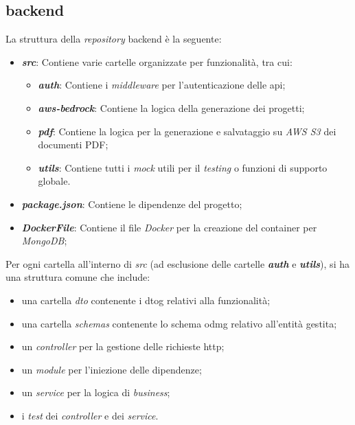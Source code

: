 \subsection{\gls{backend}}
\label{sez:backend}

La struttura della \textit{repository} \gls{backend} è la seguente:

\begin{itemize}
    \item \textbf{\textit{src}}: Contiene varie cartelle organizzate per funzionalità, tra cui:
    \begin{itemize}
        \item \textbf{\textit{auth}}: Contiene i \textit{middleware} per l'autenticazione delle \gls{api};
        \item \textbf{\textit{aws-bedrock}}: Contiene la logica della generazione dei progetti;
        \item \textbf{\textit{pdf}}: Contiene la logica per la generazione e salvataggio su \textit{AWS S3} dei documenti PDF;
        \item \textbf{\textit{utils}}: Contiene tutti i \textit{mock} utili per il \textit{testing} o funzioni di supporto globale.
    \end{itemize}
    \item \textbf{\textit{package.json}}: Contiene le dipendenze del progetto;
    \item \textbf{\textit{DockerFile}}: Contiene il file \textit{Docker} per la creazione del \gls{container} per \textit{MongoDB};
\end{itemize}

\noindent Per ogni cartella all'interno di \textit{src} (ad esclusione delle cartelle \textbf{\textit{auth}} e \textbf{\textit{utils}}), si ha una struttura comune che include:
\begin{itemize} 
    \item una cartella \textit{dto} contenente i \gls{dtog} relativi alla funzionalità;
    \item una cartella \textit{schemas} contenente lo schema \gls{odmg} relativo all'entità gestita;
    \item un \textit{controller} per la gestione delle richieste \gls{http};
    \item un \textit{module} per l'iniezione delle dipendenze;
    \item un \textit{service} per la logica di \textit{business};
    \item i \textit{test} dei \textit{controller} e dei \textit{service}.
\end{itemize}

